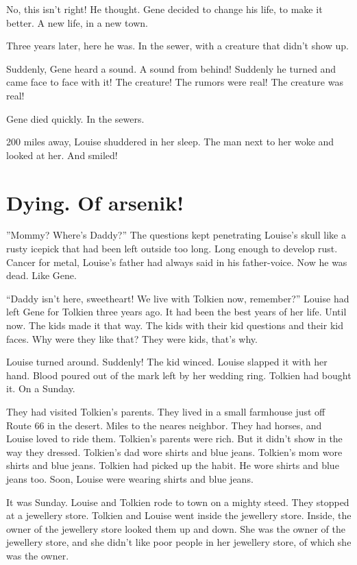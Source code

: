 No, this isn't right! He thought. Gene decided to change his life, to
make it better. A new life, in a new town.

Three years later, here he was. In the sewer, with a creature that
didn't show up.

Suddenly, Gene heard a sound. A sound from behind! Suddenly he turned
and came face to face with it! The creature! The rumors were real! The
creature was real!

Gene died quickly. In the sewers.

200 miles away, Louise shuddered in her sleep. The man next to her woke
and looked at her. And smiled!

\section*{Dying. Of arsenik!}



''Mommy? Where's Daddy?'' The questions kept
penetrating Louise's skull like a rusty icepick that had been
left outside too long. Long enough to develop rust. Cancer for
metal, Louise's father had always said in his father-voice. Now he
was dead. Like Gene.



``Daddy isn't here, sweetheart! We live with Tolkien now, remember?''
Louise had left Gene for Tolkien three years ago. It had been the
best years of her life. Until now. The kids made it that way. The
kids with their kid questions and their kid faces. Why were they
like that? They were kids, that's why.



Louise turned around. Suddenly! The kid winced. Louise slapped it
with her hand. Blood poured out of the mark left by her wedding
ring. Tolkien had bought it. On a Sunday.



They had visited Tolkien's parents. They lived in a small farmhouse
just off Route 66 in the desert. Miles to the neares neighbor. They
had horses, and Louise loved to ride them. Tolkien's parents were
rich. But it didn't show in the way they dressed. Tolkien's dad
wore shirts and blue jeans. Tolkien's mom wore shirts and blue
jeans. Tolkien had picked up the habit. He wore shirts and blue
jeans too. Soon, Louise were wearing shirts and blue jeans.



It was Sunday. Louise and Tolkien rode to town on a mighty steed.
They stopped at a jewellery store. Tolkien and Louise went inside
the jewellery store. Inside, the owner of the jewellery store
looked them up and down. She was the owner of the jewellery store,
and she didn't like poor people in her jewellery store, of which
she was the owner.



